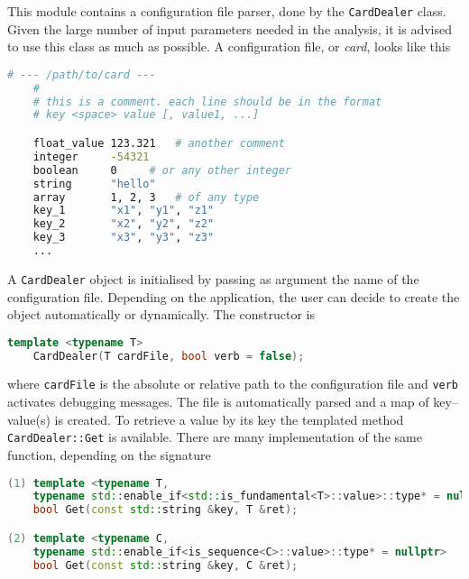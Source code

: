 \documentclass[a4paper, 11pt]{article}
\begin{document}
This module contains a configuration file parser, done by the \texttt{CardDealer} class.
Given the large number of input parameters needed in the analysis, it is advised to use this class as much as possible.
A configuration file, or \emph{card}, looks like this
\begin{lstlisting}[language=bash]
	# --- /path/to/card ---
	#
	# this is a comment. each line should be in the format
	# key <space> value [, value1, ...]

	float_value	123.321	  # another comment
	integer		-54321
	boolean		0	  # or any other integer
	string		"hello"
	array		1, 2, 3	  # of any type
	key_1		"x1", "y1", "z1"
	key_2		"x2", "y2", "z2"
	key_3		"x3", "y3", "z3"
	...
\end{lstlisting}

A \texttt{CardDealer} object is initialised by passing as argument the name of the configuration file.
Depending on the application, the user can decide to create the object automatically or dynamically.
The constructor is
\begin{lstlisting}[language=C++]
	template <typename T>
	CardDealer(T cardFile, bool verb = false);
\end{lstlisting}
where \texttt{cardFile} is the absolute or relative path to the configuration file and %
\texttt{verb} activates debugging messages.
The file is automatically parsed and a map of key--value(s) is created.
To retrieve a value by its key the templated method \texttt{CardDealer::Get} is available.
There are many implementation of the same function, depending on the signature
\begin{lstlisting}[language=C++]
(1) template <typename T,
    typename std::enable_if<std::is_fundamental<T>::value>::type* = nullptr>
    bool Get(const std::string &key, T &ret);

(2) template <typename C,
    typename std::enable_if<is_sequence<C>::value>::type* = nullptr>
    bool Get(const std::string &key, C &ret);
\end{lstlisting}
\end{document}
